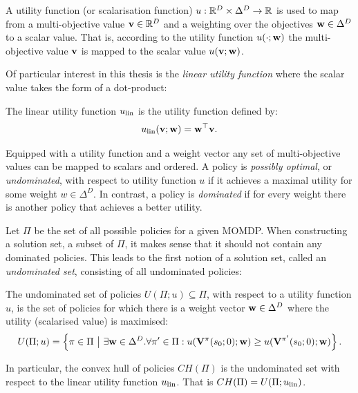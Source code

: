    \begin{defn}
        \label{def:2:utility_fn}
        \label{def:2:scalarisation_fn}
        A \textnormal{utility function} (or \textnormal{scalarisation function}) $u:\mathbb{R}^D\times\Delta^D \rightarrow \mathbb{R}$ is used to map from a multi-objective value $\mathbf{v}\in\mathbb{R}^D$ and a weighting over the objectives $\mathbf{w}\in\Delta^D$ to a scalar value. That is, according to the utility function $u(\cdot;\mathbf{w})$ the multi-objective value $\mathbf{v}$ is mapped to the scalar value $u(\mathbf{v};\mathbf{w})$.
    \end{defn}

    Of particular interest in this thesis is the \textit{linear utility function} where the scalar value takes the form of a dot-product:
    \begin{defn}
        \label{def:2:linear_utility_fn}
        \label{def:2:linear_scalarisation_fn}
        The \textnormal{linear utility function} $u_{{\textnormal{lin}}}$ is the utility function defined by:
        \begin{align}
            u_{{\textnormal{lin}}}(\mathbf{v};\mathbf{w}) = \mathbf{w}^\top \mathbf{v}. \label{eq:2:linear_utility_fn_def}
        \end{align}
    \end{defn}

    Equipped with a utility function and a weight vector any set of multi-objective values can be mapped to scalars and ordered. A policy is \textit{possibly optimal}, or \textit{undominated}, with respect to utility function $u$ if it achieves a maximal utility for some weight $w\in\Delta^D$. In contrast, a policy is \textit{dominated} if for every weight there is another policy that achieves a better utility. 
    
    Let $\Pi$ be the set of all possible policies for a given MOMDP. When constructing a solution set, a subset of $\Pi$, it makes sense that it should not contain any dominated policies. This leads to the first notion of a solution set, called an \textit{undominated set}, consisting of all undominated policies:
    \begin{defn}
        \label{def:2:undominated_set}
        \label{def:2:convex_hull}
        The \textnormal{undominated set} of policies $U(\Pi;u)\subseteq\Pi$, with respect to a utility function $u$,  is the set of policies for which there is a weight vector $\mathbf{w}\in\Delta^D$ where the utility (scalarised value) is maximised: 
        \begin{align}
            U(\Pi;u) = \left\{\pi\in\Pi\ \big|\ \exists \mathbf{w}\in\Delta^D. \forall \pi'\in\Pi: u(\mathbf{V}^{\pi}(s_0;0);\mathbf{w}) \geq u(\mathbf{V}^{\pi'}(s_0;0);\mathbf{w}) \right\}. \label{eq:2:undominated_set_def}
        \end{align}

        In particular, the \textnormal{convex hull} of policies $CH(\Pi)$ is the undominated set with respect to the linear utility function $u_{{\textnormal{lin}}}$. That is $CH(\Pi)=U(\Pi;u_{{\textnormal{lin}}})$.
    \end{defn}    

